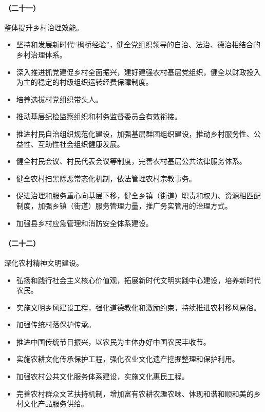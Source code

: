 \paragraph{（二十一）}整体提升乡村治理效能。

\begin{itemize}
    \item 坚持和发展新时代“枫桥经验”，健全党组织领导的自治、法治、德治相结合的乡村治理体系。
    \item 深入推进抓党建促乡村全面振兴，建好建强农村基层党组织，健全以财政投入为主的稳定的村级组织运转经费保障制度。
    \item 培养选拔村党组织带头人。
    \item 推动基层纪检监察组织和村务监督委员会有效衔接。
    \item 推进村民自治组织规范化建设，加强基层群团组织建设，推动乡村服务性、公益性、互助性社会组织健康发展。
    \item 健全村民会议、村民代表会议等制度，完善农村基层公共法律服务体系。
    \item 健全农村扫黑除恶常态化机制，依法管理农村宗教事务。
    \item 促进治理和服务重心向基层下移，健全乡镇（街道）职责和权力、资源相匹配制度，加强乡镇（街道）服务管理力量，推广务实管用的治理方式。
    \item 加强县乡村应急管理和消防安全体系建设。
\end{itemize}

\paragraph{（二十二）}深化农村精神文明建设。

\begin{itemize}
    \item 弘扬和践行社会主义核心价值观，拓展新时代文明实践中心建设，培养新时代农民。
    \item 实施文明乡风建设工程，强化道德教化和激励约束，持续推进农村移风易俗。
    \item 加强传统村落保护传承。
    \item 推进中国传统节日振兴，以农民为主体办好中国农民丰收节。
    \item 实施农耕文化传承保护工程，强化农业文化遗产挖掘整理和保护利用。
    \item 加强农村公共文化服务体系建设，实施文化惠民工程。
    \item 完善农村群众文艺扶持机制，增加富有农耕农趣农味、体现和谐和顺和美的乡村文化产品服务供给。
\end{itemize}

